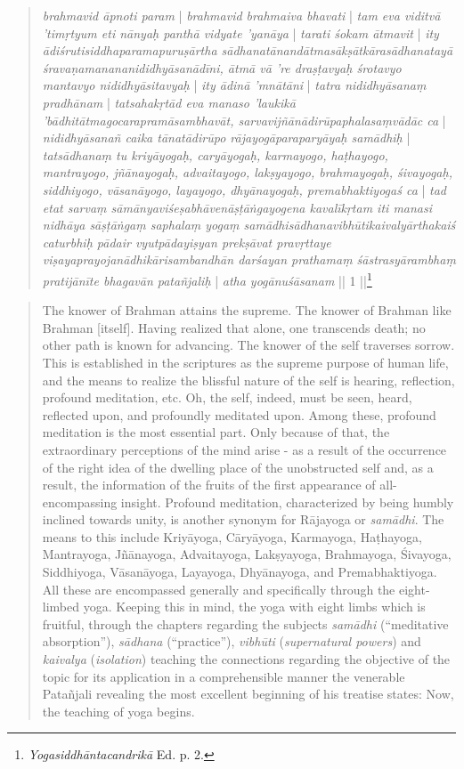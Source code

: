 \begin{quote}
\textit{brahmavid āpnoti param} | \textit{brahmavid brahmaiva bhavati} | \textit{tam eva viditvā 'timṛtyum eti nānyaḥ panthā vidyate 'yanāya} | \textit{tarati śokam ātmavit} | \textit{ity ādiśrutisiddhaparamapuruṣārtha sādhanatānandātmasākṣātkārasādhanatayā śravaṇamanananididhyāsanādīni, ātmā vā 're draṣṭavyaḥ śrotavyo mantavyo nididhyāsitavyaḥ} | \textit{ity ādinā 'mnātāni} | \textit{tatra nididhyāsanaṃ pradhānam} | \textit{tatsahakṛtād eva manaso 'laukikā 'bādhitātmagocarapramāsambhavāt, sarvavijñānādirūpaphalasaṃvādāc ca} | \textit{nididhyāsanañ caika tānatādirūpo rājayogāparaparyāyaḥ samādhiḥ} | \textit{tatsādhanaṃ tu kriyāyogaḥ, caryāyogaḥ, karmayogo, haṭhayogo, mantrayogo, jñānayogaḥ, advaitayogo, lakṣyayogo, brahmayogaḥ, śivayogaḥ, siddhiyogo, vāsanāyogo, layayogo, dhyānayogaḥ, premabhaktiyogaś ca} | \textit{tad etat sarvaṃ sāmānyaviśeṣabhāvenāṣṭāṅgayogena kavalīkṛtam iti manasi nidhāya sāṣṭāṅgaṃ saphalaṃ yogaṃ samādhisādhanavibhūtikaivalyārthakaiś caturbhiḥ pādair vyutpādayiṣyan prekṣāvat pravṛttaye viṣayaprayojanādhikārisambandhān darśayan prathamaṃ śāstrasyārambhaṃ pratijānīte bhagavān patañjaliḥ} | \textit{atha yogānuśāsanam} || 1 ||\footnote{\emph{Yogasiddhāntacandrikā} Ed. p. 2.}
\end{quote}
\begin{quote}
  The knower of Brahman attains the supreme. The knower of Brahman like Brahman [itself]. Having realized that alone, one transcends death; no other path is known for advancing. The knower of the self traverses sorrow. This is established in the scriptures as the supreme purpose of human life, and the means to realize the blissful nature of the self is hearing, reflection, profound meditation, etc. Oh, the self, indeed, must be seen, heard, reflected upon, and profoundly meditated upon. Among these, profound meditation is the most essential part. Only because of that, the extraordinary perceptions of the mind arise - as a result of the occurrence of the right idea of the dwelling place of the unobstructed self and, as a result, the information of the fruits of the first appearance of all-encompassing insight. Profound meditation, characterized by being humbly inclined towards unity, is another synonym for Rājayoga or \textit{samādhi}. The means to this include Kriyāyoga, Cāryāyoga, Karmayoga, Haṭhayoga, Mantrayoga, Jñānayoga, Advaitayoga, Lakṣyayoga, Brahmayoga, Śivayoga, Siddhiyoga, Vāsanāyoga, Layayoga, Dhyānayoga, and Premabhaktiyoga. All these are encompassed generally and specifically through the eight-limbed yoga. Keeping this in mind, the yoga with eight limbs which is fruitful, through the chapters regarding the subjects \textit{samādhi} (``meditative absorption''), \textit{sādhana} (``practice''), \textit{vibhūti} (\textit{supernatural powers}) and \textit{kaivalya} (\textit{isolation}) teaching the connections regarding the objective of the topic for its application in a comprehensible manner the venerable Patañjali revealing the most excellent beginning of his treatise states: Now, the teaching of yoga begins.
  \end{quote}

